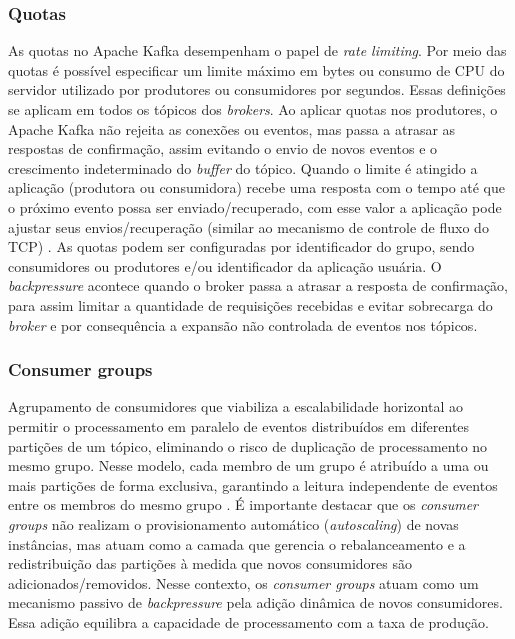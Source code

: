 \documentclass[12pt]{article}
\begin{document}
  \subsubsection{Quotas}
  As quotas no Apache Kafka desempenham o papel de \textit{rate limiting}. Por meio das quotas é possível especificar um limite máximo em bytes ou consumo de CPU do servidor utilizado por produtores ou consumidores por segundos. Essas definições se aplicam em todos os tópicos dos \textit{brokers}. Ao aplicar quotas nos produtores, o Apache Kafka não rejeita as conexões ou eventos, mas passa a atrasar as respostas de confirmação, assim evitando o envio de novos eventos e o crescimento indeterminado do \textit{buffer} do tópico. Quando o limite é atingido a aplicação (produtora ou consumidora) recebe uma resposta com o tempo até que o próximo evento possa ser enviado/recuperado, com esse valor a aplicação pode ajustar seus envios/recuperação (similar ao mecanismo de controle de fluxo do TCP) \cite{conduktorQuotaDerosiaux2026}. As quotas podem ser configuradas por identificador do grupo, sendo consumidores ou produtores e/ou identificador da aplicação usuária. O \textit{backpressure} acontece quando o broker passa a atrasar a resposta de confirmação, para assim limitar a quantidade de requisições recebidas e evitar sobrecarga do \textit{broker} e por consequência a expansão não controlada de eventos nos tópicos.

  \subsubsection{Consumer groups}
  Agrupamento de consumidores que viabiliza a escalabilidade horizontal ao permitir o processamento em paralelo de eventos distribuídos em diferentes partições de um tópico, eliminando o risco de duplicação de processamento no mesmo grupo. Nesse modelo, cada membro de um grupo é atribuído a uma ou mais partições de forma exclusiva, garantindo a leitura independente de eventos entre os membros do mesmo grupo \cite{gorshkova2026kafka, conduktorConsumerGroupsDerosiaux2026}. É importante destacar que os \textit{consumer groups} não realizam o provisionamento automático (\textit{autoscaling}) de novas instâncias, mas atuam como a camada que gerencia o rebalanceamento e a redistribuição das partições à medida que novos consumidores são adicionados/removidos. Nesse contexto, os \textit{consumer groups} atuam como um mecanismo passivo de \textit{backpressure} pela adição dinâmica de novos consumidores. Essa adição equilibra a capacidade de processamento com a taxa de produção.
\end{document}
